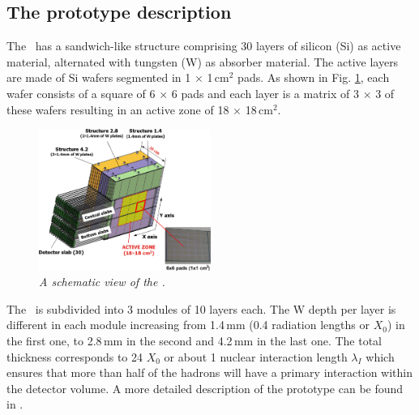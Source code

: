 \subsection{The prototype description}
\label{sec:ecal}
The \ecalp\ has a sandwich-like structure comprising 30 layers of silicon (Si) as active material, alternated with tungsten (W) as absorber material. The active layers are made of Si wafers segmented in 1 $\times$ 1\,cm$^2$ pads. As shown in Fig. \ref{fig:ECAL-scheme}, each wafer consists of a square of 6 $\times$ 6 pads and each layer is a matrix of 3 $\times$ 3 of these wafers resulting in an active zone of 18 $\times$ 18\,cm$^2$.
\begin{figure}[H]
	\centering
	\includegraphics[width=0.5\textwidth]{ECAL/graphics/ecal-new.png}
	\caption{\label{fig:ECAL-scheme} \sl A schematic view of the \ecalp.}
\end{figure}
The \ecal\ is subdivided into 3 modules of 10 layers each. The W depth per layer is different in each module increasing from 1.4\,mm (0.4 radiation lengths or $X_0$) in the first one, to 2.8\,mm in the second and 4.2\,mm in the last one. The total thickness corresponds to 24 $X_0$ or about 1 nuclear interaction length $\lambda_I$ which ensures that more than half of the hadrons will have a primary interaction within the detector volume.
A more detailed description of the prototype can be found in \cite{Anduze:2008hq}.


\label{sec:data}
